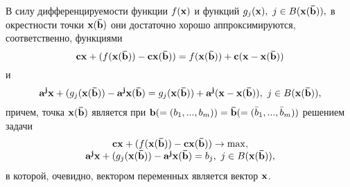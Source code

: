     В силу дифференцируемости функции $f(\mathbf{x})$ и функций
    $g_{j}(\mathbf{x}), \ j\in B(\mathbf{x}(\mathbf{\bar{b}})),$ в окрестности
    точки $\mathbf{x}(\mathbf{\bar{b}})$ они достаточно хорошо
    аппроксимируются, соответственно, функциями
    \[\mathbf{c}\mathbf{x}+(f(\mathbf{x}(\mathbf{\bar{b}}))-\mathbf{c}\mathbf{x}(\mathbf{\bar{b}}))=
    f(\mathbf{x}(\mathbf{\bar{b}}))+\mathbf{c}(\mathbf{x}-\mathbf{x}(\mathbf{\bar{b}}))\]
    и
    \[\mathbf{a^{j}}\mathbf{x}+(g_{j}(\mathbf{x}(\mathbf{\bar{b}}))-\mathbf{a^{j}}\mathbf{x}(\mathbf{\bar{b}})=
    g_{j}(\mathbf{x}(\mathbf{\bar{b}}))+\mathbf{a^{j}}(\mathbf{x}-\mathbf{x}(\mathbf{\bar{b}})),
    \ j\in B(\mathbf{x}(\mathbf{\bar{b}})),\]
    причем, точка $\mathbf{x}(\mathbf{\bar{b}})$
    является при $\mathbf{b}(=(b_{1},...,b_{m}))=\mathbf{\bar{b}}(=(\bar{b}_{1},...,\bar{b}_{m}))$
    решением задачи
\begin{equation}
    \label{zad-np-activ-lin-app}
\begin{array}{c}
  \mathbf{c}\mathbf{x}+(f(\mathbf{x}(\mathbf{\bar{b}}))-\mathbf{c}\mathbf{x}(\mathbf{\bar{b}}))\rightarrow\max, \\
  \mathbf{a^{j}}\mathbf{x}+(g_{j}(\mathbf{x}(\mathbf{\bar{b}}))-\mathbf{a^{j}}\mathbf{x}(\mathbf{\bar{b}})
    =b_{j}, \ j\in B(\mathbf{x}(\mathbf{\bar{b}})),
\end{array}
\end{equation}
    в которой, очевидно, вектором переменных является вектор $\mathbf{x}$.


